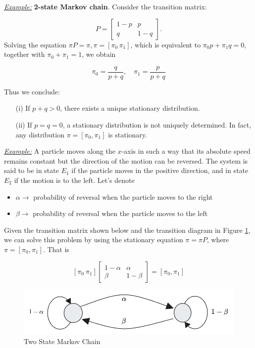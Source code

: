 \documentclass[a4paper,10pt]{article}
\begin{document}
\noindent \textit{\underline{Example:}} \textbf{2-state Markov chain}. Consider the transition matrix:

\[
P = \begin{bmatrix}
1 - p & p \\
q & 1 - q
\end{bmatrix}.
\]
Solving the equation $\pi P = \pi, \pi = [\pi_0 \, \pi_1]$, which is equivalent to $\pi_0 p + \pi_1 q = 0$, together with $\pi_0 + \pi_1 = 1$, we obtain

\[
\pi_0 = \frac{q}{p + q}, \quad \pi_1 = \frac{p}{p + q}
\]

\noindent Thus we conclude:
\begin{itemize}
    \item[(i)] If $p + q > 0$, there exists a unique stationary distribution.
    \item[(ii)] If $p = q = 0$, a stationary distribution is not uniquely determined. In fact, any distribution $\pi = [\pi_0, \pi_1]$ is stationary.\\
\end{itemize}

\noindent \underline{\textit{Example:}} A particle moves along the $x$-axis in such a way that its absolute speed remains constant but the direction of the motion can be reversed. The system is said to be in state $E_1$ if the particle moves in the positive direction, and in state $E_2$ if the motion is to the left. Let's denote

\begin{itemize}
    \item $\alpha \rightarrow$ probability of reversal when the particle moves to the right 
    \item $\beta \rightarrow$ probability of reversal when the particle moves to the left 
\end{itemize}

Given the transition matrix shown below and the transition diagram in Figure \ref{fig:two_state_markov}, we can solve this problem by using the stationary equation $\pi = \pi P$, where $\pi = [\pi_0, \pi_1]$. That is

\[
[\pi_0 \ \pi_1] \begin{bmatrix}
1 - \alpha & \alpha \\
\beta & 1 - \beta 
\end{bmatrix} = [\pi_0, \pi_1]
\]

\begin{figure}[ht]
\centering
\includegraphics[width=0.6\linewidth]{Figures/two_state_markov.png}
\caption{Two State Markov Chain}
\label{fig:two_state_markov}
\end{figure}
\end{document}

